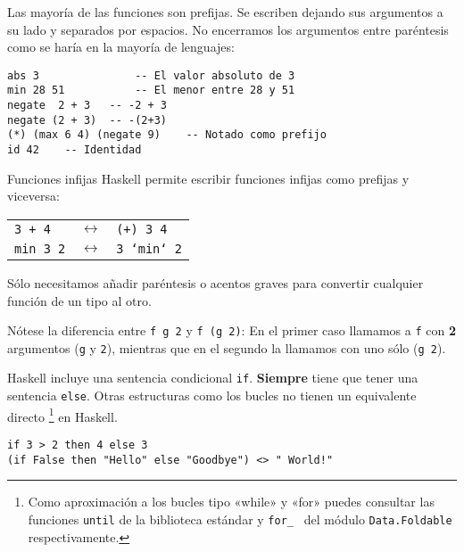 Las mayoría de las funciones son prefijas. Se escriben dejando sus argumentos a
su lado y separados por espacios. No encerramos los argumentos entre paréntesis
como se haría en la mayoría de lenguajes:

\begin{lstlisting}
abs 3				-- El valor absoluto de 3
min 28 51			-- El menor entre 28 y 51
negate  2 + 3   -- -2 + 3
negate (2 + 3)  -- -(2+3)
(*) (max 6 4) (negate 9)	-- Notado como prefijo
id 42	 -- Identidad
\end{lstlisting}

\begin{extra}{Funciones infijas}
Haskell permite escribir funciones infijas como prefijas y viceversa:

\espacio

\begin{tabular}{lcl}
  \texttt{3 + 4} & $\longleftrightarrow$ & \texttt{(+) 3 4} \\
  \texttt{min 3 2} & $\longleftrightarrow$ & \texttt{3 `min` 2}\\
\end{tabular}

\espacio

Sólo necesitamos añadir paréntesis o acentos graves para convertir
cualquier función de un tipo al otro.
\end{extra}

Nótese la diferencia entre \texttt{f g 2} y \texttt{f (g 2)}: En el primer caso
llamamos a \texttt{f} con \textbf{2} argumentos (\texttt{g} y \texttt{2}), mientras
que en el segundo la llamamos con uno sólo (\texttt{g 2}).

Haskell incluye una sentencia condicional \texttt{if}.
\textbf{Siempre} tiene que tener una sentencia \texttt{else}.
Otras estructuras como los bucles no tienen un equivalente directo \footnote{Como aproximación a los bucles tipo «while» y «for» puedes consultar las funciones \texttt{until} de la biblioteca estándar y \texttt{for\_ } del módulo \texttt{Data.Foldable} respectivamente.} en Haskell.

\begin{lstlisting}
if 3 > 2 then 4 else 3
(if False then "Hello" else "Goodbye") <> " World!"
\end{lstlisting}

\newpage
